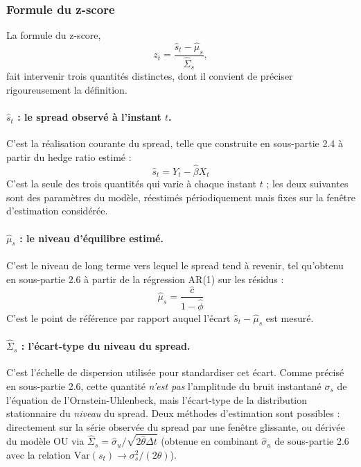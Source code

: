 \documentclass{article}
\begin{document}
\subsubsection*{Formule du z-score}
La formule du z-score,
\begin{equation}
z_t = \frac{\hat{s}_t - \hat{\mu}_s}{\hat{\Sigma}_s},
\end{equation}
fait intervenir trois quantités distinctes, dont il convient de préciser rigoureusement la définition.
\paragraph{$\hat{s}_t$ : le spread observé à l'instant $t$.} C'est la réalisation courante du spread, telle que construite en sous-partie 2.4 à partir du hedge ratio estimé :
\begin{equation}
\hat{s}_t = Y_t - \hat\beta X_t
\end{equation}
C'est la seule des trois quantités qui varie à chaque instant $t$ ; les deux suivantes sont des paramètres du modèle, réestimés périodiquement mais fixes sur la fenêtre d'estimation considérée.
\paragraph{$\hat{\mu}_s$ : le niveau d'équilibre estimé.} C'est le niveau de long terme vers lequel le spread tend à revenir, tel qu'obtenu en sous-partie 2.6 à partir de la régression AR(1) sur les résidus :
\begin{equation}
\hat\mu_s = \frac{\hat{c}}{1 - \hat\phi}
\end{equation}
C'est le point de référence par rapport auquel l'écart $\hat{s}_t - \hat\mu_s$ est mesuré.
\paragraph{$\hat{\Sigma}_s$ : l'écart-type du niveau du spread.} C'est l'échelle de dispersion utilisée pour standardiser cet écart. Comme précisé en sous-partie 2.6, cette quantité \emph{n'est pas} l'amplitude du bruit instantané $\sigma_s$ de l'équation de l'Ornstein-Uhlenbeck, mais l'écart-type de la distribution stationnaire du \emph{niveau} du spread. Deux méthodes d'estimation sont possibles : directement sur la série observée du spread par une fenêtre glissante, ou dérivée du modèle OU via $\hat\Sigma_s = \hat\sigma_u/\sqrt{2\hat\theta \Delta t}$ (obtenue en combinant $\hat\sigma_u$ de sous-partie 2.6 avec la relation $\text{Var}(s_t) \to \sigma_s^2/(2\theta)$).
\end{document}
